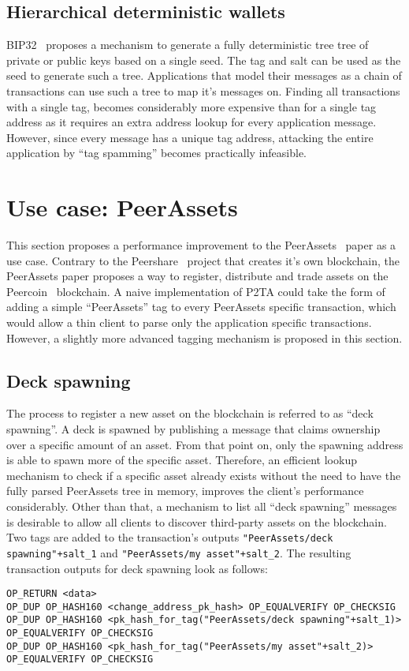 \documentclass[a4paper,10pt]{article}
\begin{document}
\subsection{Hierarchical deterministic wallets}
BIP32~\cite{Wui12} proposes a mechanism to generate a fully deterministic tree tree of private or public keys based on a single seed.
The tag and salt can be used as the seed to generate such a tree.
Applications that model their messages as a chain of transactions can use such a tree to map it's messages on.
Finding all transactions with a single tag, becomes considerably more expensive than for a single tag address as it requires an extra address lookup for every application message.
However, since every message has a unique tag address, attacking the entire application by ``tag spamming'' becomes practically infeasible.


\section{Use case: PeerAssets}
This section proposes a performance improvement to the PeerAssets~\cite{Pchem} paper as a use case.
Contrary to the Peershare~\cite{Lee13} project that creates it's own blockchain, the PeerAssets paper proposes a way to register, distribute and trade assets on the Peercoin~\cite{King12} blockchain.
A naive implementation of P2TA could take the form of adding a simple ``PeerAssets'' tag to every PeerAssets specific transaction, which would allow a thin client to parse only the application specific transactions.
However, a slightly more advanced tagging mechanism is proposed in this section.

\subsection{Deck spawning}
The process to register a new asset on the blockchain is referred to as ``deck spawning''. A deck is spawned by publishing a message that claims ownership over a specific amount of an asset. From that point on, only the spawning address is able to spawn more of the specific asset. Therefore, an efficient lookup mechanism to check if a specific asset already exists without the need to have the fully parsed PeerAssets tree in memory, improves the client's performance considerably. Other than that, a mechanism to list all ``deck spawning'' messages is desirable to allow all clients to discover third-party assets on the blockchain.
Two tags are added to the transaction's outputs \verb|"PeerAssets/deck spawning"+salt_1| and \verb|"PeerAssets/my asset"+salt_2|.
The resulting transaction outputs for deck spawning look as follows:
\begin{scriptsize}\begin{verbatim}
OP_RETURN <data>
OP_DUP OP_HASH160 <change_address_pk_hash> OP_EQUALVERIFY OP_CHECKSIG
OP_DUP OP_HASH160 <pk_hash_for_tag("PeerAssets/deck spawning"+salt_1)> OP_EQUALVERIFY OP_CHECKSIG
OP_DUP OP_HASH160 <pk_hash_for_tag("PeerAssets/my asset"+salt_2)> OP_EQUALVERIFY OP_CHECKSIG
\end{verbatim}\end{scriptsize}
\end{document}
